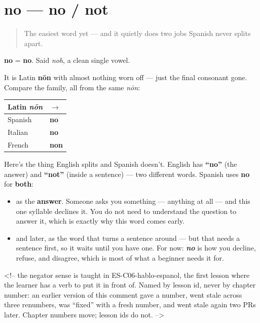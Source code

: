 \section[no]{no — no / not}

\label{lesson:ES-C19-no}



\begin{quote}
The easiest word yet — and it quietly does two jobs Spanish never splits apart.
\end{quote}

\begin{cousinweb}
\textbf{no} = \textbf{no}. Said \emph{noh}, a clean single vowel.

It is Latin \textbf{nōn} with almost nothing worn off — just the final consonant gone. Compare the family, all from the same \emph{nōn}:

\noindent
\begin{tabularx}{\linewidth}{@{}>{\raggedright\arraybackslash}X>{\raggedright\arraybackslash}X@{}}
\toprule
\textbf{Latin \emph{nōn}} & \textbf{$\to$} \\
\midrule
Spanish & \textbf{no} \\
Italian & \textbf{no} \\
French & \textbf{non} \\
\bottomrule
\end{tabularx}
\end{cousinweb}

\begin{culture}
Here's the thing English splits and Spanish doesn't. English has \textbf{\textquotedblleft{}no\textquotedblright{}} (the answer) and \textbf{\textquotedblleft{}not\textquotedblright{}} (inside a sentence) — two different words. Spanish uses \textbf{no} for \textbf{both}:

\begin{itemize}
\raggedright
  \item as the \textbf{answer}. Someone asks you something — anything at all — and this one syllable declines it. You do not need to understand the question to answer it, which is exactly why this word comes early.
  \item and later, as the word that turns a sentence around — but that needs a sentence first, so it waits until you have one. For now: \emph{\textbf{no}} is how you decline, refuse, and disagree, which is most of what a beginner needs it for.
\end{itemize}

<!-- the negator sense is taught in ES-C06-hablo-espanol, the first lesson where the learner has a verb to put it in front of. Named by lesson id, never by chapter number: an earlier version of this comment gave a number, went stale across three renumbers, was \textquotedblleft{}fixed\textquotedblright{} with a fresh number, and went stale again two PRs later. Chapter numbers move; lesson ids do not. -->
\end{culture}


